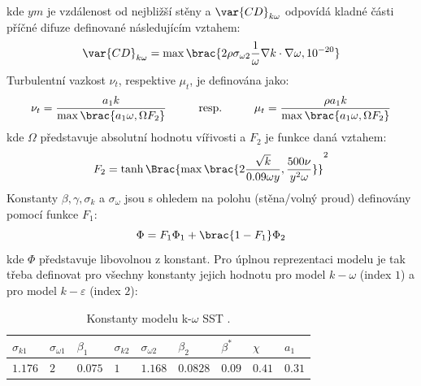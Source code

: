         \noindent kde $y \unit{m}$ je vzdálenost od nejbližší stěny a $\var{CD}_{k \omega}$ odpovídá kladné části příčné difuze definované následujícím vztahem:
        \begin{equation}
            \var{CD}_{k \omega} = \max \brac{2 \rho \sigma _{\omega 2} \frac{1}{\omega} \nabla k \cdot \nabla \omega, 10^{-20}}
        \end{equation}
        Turbulentní vazkost $\nu _t$, respektive $\mu _t$, je definována jako:
        \begin{equation} \label{eq:turbulentni-vazkost}
            \nu _t = \frac{a_1 k}{\max \brac{a_1 \omega, \Omega F_2}} \hspace{1cm} \textrm{resp.} \hspace{1cm} \mu _t = \frac{\rho a_1 k}{\max \brac{a_1 \omega, \Omega F_2}}
        \end{equation}
        \noindent kde $\Omega$ představuje absolutní hodnotu vířivosti a $F_2$ je funkce daná vztahem:
        \begin{equation}
            F_2 = \tanh \Brac{\max \brac{2\frac{\sqrt{k}}{0.09 \omega y}, \frac{500 \nu}{y^2 \omega}}}^2
        \end{equation}
        \newpage
        Konstanty $\beta, \gamma, \sigma _k$ a $\sigma _\omega$ jsou s ohledem na polohu (stěna/volný proud) definovány pomocí funkce $F_1$:
        \begin{equation}
            \Phi = F_1 \Phi _1 + \brac{1 - F_1} \Phi _2
        \end{equation}
        \noindent kde $\Phi$ představuje libovolnou z konstant. Pro úplnou reprezentaci modelu je tak třeba definovat pro všechny konstanty jejich hodnotu pro model $k-\omega$ (index $1$) a pro model $k-\varepsilon$ (index $2$):

        \begin{table}[ht!]
            \centering
            \caption{Konstanty modelu k-$\omega$ SST \cite{Ansys2020Theory}.}
            \begin{tabular}{l|l|l|l|l|l|l|l|l}
                $\sigma _{k 1}$ & $\sigma _{\omega 1}$ & $\beta _1$ & $\sigma _{k 2}$ & $\sigma _{\omega 2}$ & $\beta _2$ & $\beta ^*$      & $\chi$               & $a_1$   \\ \hline
                $1.176$         & $2$                  & $0.075   $ & $1$             & $1.168$              & $0.0828$   & $0.09$          & $0.41$               & $0.31$  \\           
            \end{tabular}
            \label{tab:konstanty-turbulence}
        \end{table}

